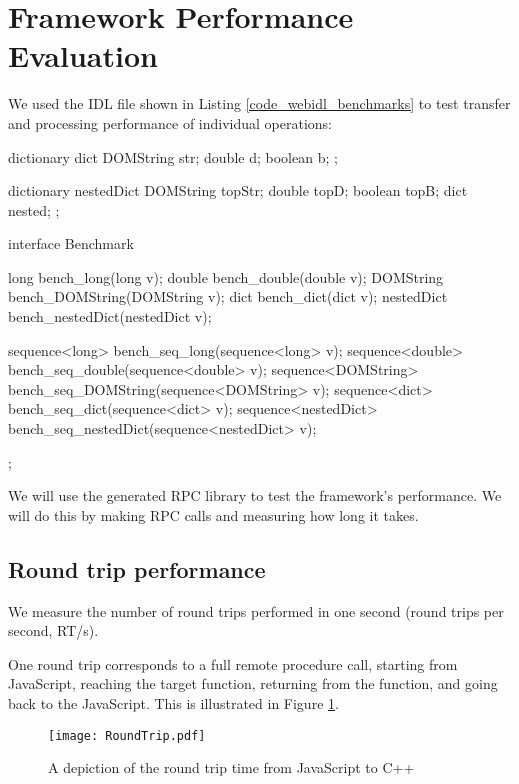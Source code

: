
\section{Framework Performance Evaluation} %
\label{sec:performance_evaluation}
We used the IDL file shown in Listing \ref{code_webidl_benchmarks} to test transfer and processing performance of individual operations:

\begin{code}
dictionary dict {
  DOMString str;
  double d;
  boolean b;
};

dictionary nestedDict {
  DOMString topStr;
  double topD;
  boolean topB;
  dict nested;
};

interface Benchmark{
  long bench_long(long v);
  double bench_double(double v);
  DOMString bench_DOMString(DOMString v);
  dict bench_dict(dict v);
  nestedDict bench_nestedDict(nestedDict v);

  sequence<long> bench_seq_long(sequence<long> v);
  sequence<double> bench_seq_double(sequence<double> v);
  sequence<DOMString> bench_seq_DOMString(sequence<DOMString> v);
  sequence<dict> bench_seq_dict(sequence<dict> v);
  sequence<nestedDict> bench_seq_nestedDict(sequence<nestedDict> v);
};
\end{code}

We will use the generated RPC library to test the framework's performance. We will do this by making RPC calls and measuring how long it takes.

\subsection{Round trip performance}\label{round-trip-performance}

We measure the number of round trips performed in one second (round trips per second, RT/s).

One round trip corresponds to a full remote procedure call, starting from JavaScript, reaching the target function, returning from the function, and going back to the JavaScript. This is illustrated in Figure \ref{fig:rpc_roundtrip}.


\begin{figure}
    \centering
    \texttt{[image: RoundTrip.pdf]} 
    \caption{A depiction of the round trip time from JavaScript to C++}
    \label{fig:rpc_roundtrip}
\end{figure}


